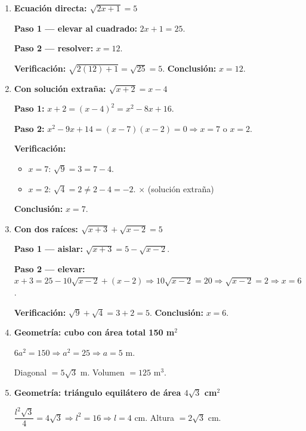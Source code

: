 \documentclass[11pt, letterpaper]{article}
\begin{document}
\begin{tcolorbox}[examplebox, title={Ejemplos}]
\begin{enumerate}[label=\textbf{Ej. \arabic*.}, leftmargin=*, itemsep=16pt]

\item \textbf{Ecuación directa: $\sqrt{2x+1}=5$}

\textbf{Paso 1 — elevar al cuadrado:} $2x+1=25$.

\textbf{Paso 2 — resolver:} $x=12$.

\textbf{Verificación:} $\sqrt{2(12)+1}=\sqrt{25}=5$. \checkmark \quad \textbf{Conclusión:} $x=12$.

\item \textbf{Con solución extraña: $\sqrt{x+2}=x-4$}

\textbf{Paso 1:} $x+2=(x-4)^2=x^2-8x+16$.

\textbf{Paso 2:} $x^2-9x+14=(x-7)(x-2)=0 \Rightarrow x=7$ o $x=2$.

\textbf{Verificación:}
\begin{itemize}[itemsep=2pt]
  \item $x=7$: $\sqrt{9}=3=7-4$. \checkmark
  \item $x=2$: $\sqrt{4}=2\neq 2-4=-2$. $\times$ (solución extraña)
\end{itemize}

\textbf{Conclusión:} $x=7$.

\item \textbf{Con dos raíces: $\sqrt{x+3}+\sqrt{x-2}=5$}

\textbf{Paso 1 — aislar:} $\sqrt{x+3}=5-\sqrt{x-2}$.

\textbf{Paso 2 — elevar:} $x+3=25-10\sqrt{x-2}+(x-2) \Rightarrow 10\sqrt{x-2}=20 \Rightarrow \sqrt{x-2}=2 \Rightarrow x=6$.

\textbf{Verificación:} $\sqrt{9}+\sqrt{4}=3+2=5$. \checkmark \quad \textbf{Conclusión:} $x=6$.

\item \textbf{Geometría: cubo con área total 150 m$^2$}

$6a^2=150 \Rightarrow a^2=25 \Rightarrow a=5$ m.

Diagonal $=5\sqrt{3}$ m. Volumen $=125$ m$^3$.

\item \textbf{Geometría: triángulo equilátero de área $4\sqrt{3}$ cm$^2$}

$\dfrac{l^2\sqrt{3}}{4}=4\sqrt{3} \Rightarrow l^2=16 \Rightarrow l=4$ cm. Altura $=2\sqrt{3}$ cm.

\end{enumerate}
\end{tcolorbox}
\end{document}
